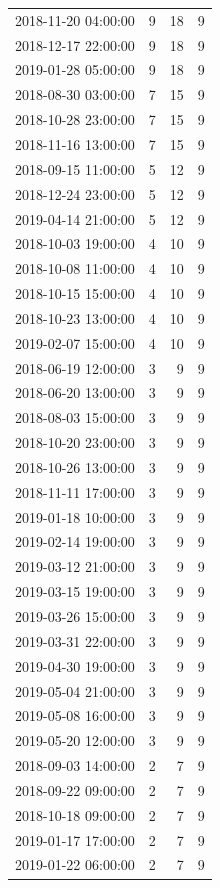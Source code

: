 \begin{tabular}{lrrr}
2018-11-20 04:00:00 & 9 & 18 & 9 \\
2018-12-17 22:00:00 & 9 & 18 & 9 \\
2019-01-28 05:00:00 & 9 & 18 & 9 \\
2018-08-30 03:00:00 & 7 & 15 & 9 \\
2018-10-28 23:00:00 & 7 & 15 & 9 \\
2018-11-16 13:00:00 & 7 & 15 & 9 \\
2018-09-15 11:00:00 & 5 & 12 & 9 \\
2018-12-24 23:00:00 & 5 & 12 & 9 \\
2019-04-14 21:00:00 & 5 & 12 & 9 \\
2018-10-03 19:00:00 & 4 & 10 & 9 \\
2018-10-08 11:00:00 & 4 & 10 & 9 \\
2018-10-15 15:00:00 & 4 & 10 & 9 \\
2018-10-23 13:00:00 & 4 & 10 & 9 \\
2019-02-07 15:00:00 & 4 & 10 & 9 \\
2018-06-19 12:00:00 & 3 & 9 & 9 \\
2018-06-20 13:00:00 & 3 & 9 & 9 \\
2018-08-03 15:00:00 & 3 & 9 & 9 \\
2018-10-20 23:00:00 & 3 & 9 & 9 \\
2018-10-26 13:00:00 & 3 & 9 & 9 \\
2018-11-11 17:00:00 & 3 & 9 & 9 \\
2019-01-18 10:00:00 & 3 & 9 & 9 \\
2019-02-14 19:00:00 & 3 & 9 & 9 \\
2019-03-12 21:00:00 & 3 & 9 & 9 \\
2019-03-15 19:00:00 & 3 & 9 & 9 \\
2019-03-26 15:00:00 & 3 & 9 & 9 \\
2019-03-31 22:00:00 & 3 & 9 & 9 \\
2019-04-30 19:00:00 & 3 & 9 & 9 \\
2019-05-04 21:00:00 & 3 & 9 & 9 \\
2019-05-08 16:00:00 & 3 & 9 & 9 \\
2019-05-20 12:00:00 & 3 & 9 & 9 \\
2018-09-03 14:00:00 & 2 & 7 & 9 \\
2018-09-22 09:00:00 & 2 & 7 & 9 \\
2018-10-18 09:00:00 & 2 & 7 & 9 \\
2019-01-17 17:00:00 & 2 & 7 & 9 \\
2019-01-22 06:00:00 & 2 & 7 & 9 \\

\end{tabular}
